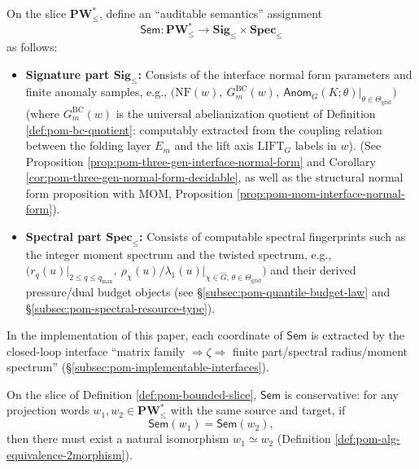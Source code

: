 \begin{definition}\label{def:pom-sem-functor}
On the slice \(\mathbf{PW}^{\ast}_{\le}\), define an ``auditable semantics'' assignment
\[
\mathsf{Sem}:\mathbf{PW}^{\ast}_{\le}\longrightarrow \mathbf{Sig}_{\le}\times \mathbf{Spec}_{\le}
\]
as follows:
\begin{itemize}
  \item \textbf{Signature part \(\mathbf{Sig}_{\le}\):} Consists of the interface normal form parameters and finite anomaly samples, e.g.,
  \(\bigl(\mathrm{NF}(w),\ G^{\mathrm{BC}}_m(w),\ \mathsf{Anom}_{G}(K;\theta)\vert_{\theta\in\Theta_{\mathrm{grid}}}\bigr)\)
  (where \(G^{\mathrm{BC}}_m(w)\) is the universal abelianization quotient of Definition \ref{def:pom-bc-quotient}: computably extracted from the coupling relation between the folding layer \(E_m\) and the lift axis \(\mathrm{LIFT}_G\) labels in \(w\)).
  (See Proposition \ref{prop:pom-three-gen-interface-normal-form} and Corollary \ref{cor:pom-three-gen-normal-form-decidable}, as well as the structural normal form proposition with \(\mathrm{MOM}\), Proposition \ref{prop:pom-mom-interface-normal-form}).
  \item \textbf{Spectral part \(\mathbf{Spec}_{\le}\):} Consists of computable spectral fingerprints such as the integer moment spectrum and the twisted spectrum, e.g.,
  \(\bigl(r_q(u)\vert_{2\le q\le q_{\max}},\ \rho_\chi(u)/\lambda_1(u)\vert_{\chi\in\widehat G,\,\theta\in\Theta_{\mathrm{grid}}}\bigr)\)
  and their derived pressure/dual budget objects (see \S\ref{subsec:pom-quantile-budget-law} and \S\ref{subsec:pom-spectral-resource-type}).
\end{itemize}
In the implementation of this paper, each coordinate of \(\mathsf{Sem}\) is extracted by the closed-loop interface ``matrix family \(\Rightarrow\zeta\Rightarrow\) finite part/spectral radius/moment spectrum'' (\S\ref{subsec:pom-implementable-interfaces}).
\end{definition}

\begin{theorem}\label{thm:pom-sem-conservative}
On the slice of Definition \ref{def:pom-bounded-slice}, \(\mathsf{Sem}\) is conservative: for any projection words \(w_1,w_2\in\mathbf{PW}^{\ast}_{\le}\) with the same source and target, if
\[
\mathsf{Sem}(w_1)=\mathsf{Sem}(w_2),
\]
then there must exist a natural isomorphism \(w_1\simeq w_2\) (Definition \ref{def:pom-alg-equivalence-2morphism}).
\end{theorem}

